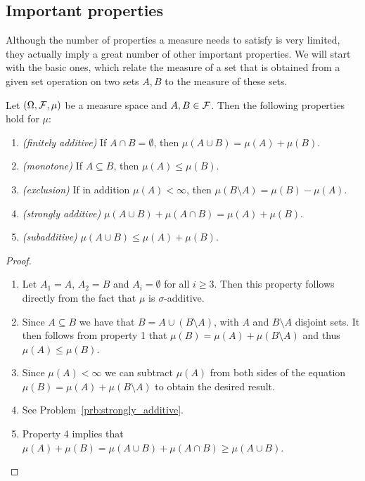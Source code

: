 
\subsection{Important properties}

Although the number of properties a measure needs to satisfy is very limited, they actually imply a great number of other important properties. We will start with the basic ones, which relate the measure of a set that is obtained from a given set operation on two sets $A, B$ to the measure of these sets.

\begin{proposition}\label{prop:basic_properties_measures}
Let $(\Omega, \mathcal F, \mu)$ be a measure space and $A, B \in \mathcal F$. Then the following properties hold for $\mu$:
\begin{enumerate}
\item \textit{(finitely additive)} If $A \cap B = \emptyset$, then $\mu(A \cup B) = \mu(A) + \mu(B)$.
\item \textit{(monotone)} If $A \subseteq B$, then $\mu(A) \le \mu(B)$.
\item \textit{(exclusion)} If in addition $\mu(A) < \infty$, then $\mu(B \setminus A) = \mu(B) - \mu(A)$.
\item \textit{(strongly additive)} $\mu(A \cup B) + \mu(A \cap B) = \mu(A) + \mu(B)$.
\item \textit{(subadditive)} $\mu(A \cup B) \le \mu(A) + \mu(B)$.
\end{enumerate}
\end{proposition}

\begin{proof}
\hfil
\begin{enumerate}
\item Let $A_1 = A$, $A_2 = B$ and $A_i = \emptyset$ for all $i \ge 3$. Then this property follows directly from the fact that $\mu$ is $\sigma$-additive.
\item Since $A \subseteq B$ we have that $B = A \cup (B \setminus A)$, with $A$ and $B \setminus A$ disjoint sets. It then follows from property 1 that $\mu(B) = \mu(A) + \mu(B \setminus A)$ and thus $\mu(A) \le \mu(B)$.
\item Since $\mu(A) < \infty$ we can subtract $\mu(A)$ from both sides of the equation $\mu(B) = \mu(A) + \mu(B \setminus A)$ to obtain the desired result.
\item See Problem~\ref{prb:strongly_additive}. 
\item Property 4 implies that $\mu(A) + \mu(B) = \mu(A \cup B) + \mu(A \cap B) \ge \mu(A \cup B)$.\qedhere
\end{enumerate}
\end{proof}

